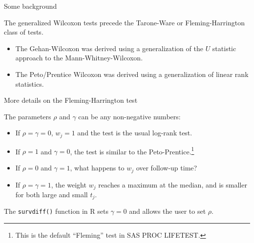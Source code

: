 \documentclass[ignorenonframetext,]{beamer}
\begin{document}
\begin{frame}{%
\protect\hypertarget{some-background}{%
Some background}}

The generalized Wilcoxon tests precede the Tarone-Ware or
Fleming-Harrington class of tests.

\begin{itemize}
\item
  The Gehan-Wilcoxon was derived using a generalization of the \(U\)
  statistic approach to the Mann-Whitney-Wilcoxon.
\item
  The Peto/Prentice Wilcoxon was derived using a generalization of
  linear rank statistics.
\end{itemize}

\end{frame}

\begin{frame}{%
\protect\hypertarget{more-details-on-the-fleming-harrington-test}{%
More details on the Fleming-Harrington test}}

The parameters \(\rho\) and \(\gamma\) can be any non-negative numbers:

\begin{itemize}
\item
  If \(\rho = \gamma = 0\), \(w_j=1\) and the test is the usual log-rank
  test.
\item
  If \(\rho=1\) and \(\gamma=0\), the test is similar to the
  Peto-Prentice.\footnote{This is the default ``Fleming'' test in SAS PROC LIFETEST.}
\item
  If \(\rho=0\) and \(\gamma=1\), what happens to \(w_j\) over follow-up
  time?
\item
  If \(\rho = \gamma = 1\), the weight \(w_j\) reaches a maximum at the
  median, and is smaller for both large and small \(t_j\).
\end{itemize}

The \texttt{survdiff()} function in \textsf{R} sets \(\gamma=0\) and
allows the user to set \(\rho\).

\end{frame}
\end{document}

